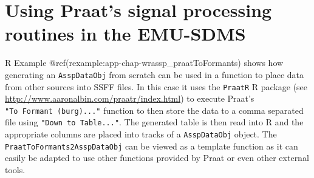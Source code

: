\documentclass[]{book}
\theoremstyle{definition}
\theoremstyle{definition}
\theoremstyle{definition}
\theoremstyle{remark}
\begin{document}
\hypertarget{sec:app-chap-wrassp-praatsSigProc}{%
\section{Using Praat's signal processing routines in the
EMU-SDMS}\label{sec:app-chap-wrassp-praatsSigProc}}

R Example @ref(rexample:app-chap-wrassp\_praatToFormants) shows how
generating an \texttt{AsspDataObj} from scratch can be used in a
function to place data from other sources into SSFF files. In this case
it uses the \texttt{PraatR} R package (see
\url{http://www.aaronalbin.com/praatr/index.html}) to execute Praat's
\texttt{"To\ Formant\ (burg)..."} function to then store the data to a
comma separated file using \texttt{"Down\ to\ Table..."}. The generated
table is then read into R and the appropriate columns are placed into
tracks of a \texttt{AsspDataObj} object. The
\texttt{PraatToFormants2AsspDataObj} can be viewed as a template
function as it can easily be adapted to use other functions provided by
Praat or even other external tools.
\end{document}
